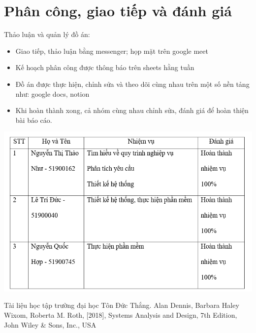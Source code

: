 \documentclass[12pt,a4paper,2sides]{report}
\begin{document}
\section{Phân công, giao tiếp và đánh giá}
Thảo luận và quản lý đồ án:
\begin{itemize}
    \item Giao tiếp, thảo luận bằng messenger; họp mặt trên google meet
    \item Kế hoạch phân công được thông báo trên sheets hằng tuần
    \item Đồ án được thực hiện, chỉnh sửa và theo dõi cùng nhau trên một số nền tảng như: google docs, notion
    \item Khi hoàn thành xong, cả nhóm cùng nhau chỉnh sửa, đánh giá để hoàn thiện bài báo cáo.
\end{itemize}

\includegraphics[width=1\linewidth]{lib/phancong.png}\\\vspace*{1cm} 

\begin{thebibliography}{5}
	\bibitem{} Tài liệu học tập trường đại học Tôn Đức Thắng.
	\bibitem{} Alan Dennis, Barbara Haley Wixom, Roberta M. Roth, [2018], Systems Analysis and Design, 7th Edition, John Wiley & Sons, Inc., USA
\end{thebibliography}
\end{document}
